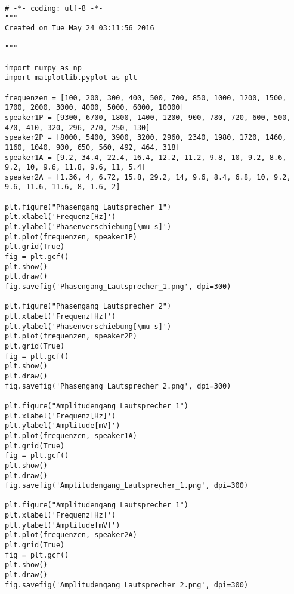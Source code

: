 \documentclass[12pt, oneside, a4paper, \docLanguage]{report}
\begin{document}
\begin{lstlisting}[style=PYTHON, frame=single, caption=Phasengang und Frequenzgang, captionpos=b, label=lst:Gaenge]

# -*- coding: utf-8 -*-
"""
Created on Tue May 24 03:11:56 2016

"""

import numpy as np
import matplotlib.pyplot as plt

frequenzen = [100, 200, 300, 400, 500, 700, 850, 1000, 1200, 1500, 1700, 2000, 3000, 4000, 5000, 6000, 10000]
speaker1P = [9300, 6700, 1800, 1400, 1200, 900, 780, 720, 600, 500, 470, 410, 320, 296, 270, 250, 130]
speaker2P = [8000, 5400, 3900, 3200, 2960, 2340, 1980, 1720, 1460, 1160, 1040, 900, 650, 560, 492, 464, 318]
speaker1A = [9.2, 34.4, 22.4, 16.4, 12.2, 11.2, 9.8, 10, 9.2, 8.6, 9.2, 10, 9.6, 11.8, 9.6, 11, 5.4]
speaker2A = [1.36, 4, 6.72, 15.8, 29.2, 14, 9.6, 8.4, 6.8, 10, 9.2, 9.6, 11.6, 11.6, 8, 1.6, 2]

plt.figure("Phasengang Lautsprecher 1")
plt.xlabel('Frequenz[Hz]')
plt.ylabel('Phasenverschiebung[\mu s]')
plt.plot(frequenzen, speaker1P)
plt.grid(True)
fig = plt.gcf()
plt.show()
plt.draw()
fig.savefig('Phasengang_Lautsprecher_1.png', dpi=300)

plt.figure("Phasengang Lautsprecher 2")
plt.xlabel('Frequenz[Hz]')
plt.ylabel('Phasenverschiebung[\mu s]')
plt.plot(frequenzen, speaker2P)
plt.grid(True)
fig = plt.gcf()
plt.show()
plt.draw()
fig.savefig('Phasengang_Lautsprecher_2.png', dpi=300)

plt.figure("Amplitudengang Lautsprecher 1")
plt.xlabel('Frequenz[Hz]')
plt.ylabel('Amplitude[mV]')
plt.plot(frequenzen, speaker1A)
plt.grid(True)
fig = plt.gcf()
plt.show()
plt.draw()
fig.savefig('Amplitudengang_Lautsprecher_1.png', dpi=300)

plt.figure("Amplitudengang Lautsprecher 1")
plt.xlabel('Frequenz[Hz]')
plt.ylabel('Amplitude[mV]')
plt.plot(frequenzen, speaker2A)
plt.grid(True)
fig = plt.gcf()
plt.show()
plt.draw()
fig.savefig('Amplitudengang_Lautsprecher_2.png', dpi=300)

\end{lstlisting}
\end{document}
